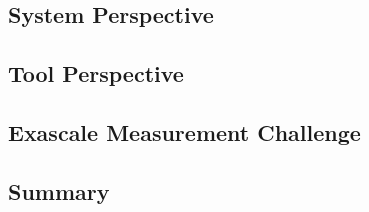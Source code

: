\subsection{System Perspective} %
%
%
\subsection{Tool Perspective} %
%
%
\subsection{Exascale Measurement Challenge} %
%
%
\subsection{Summary} %
%
%




